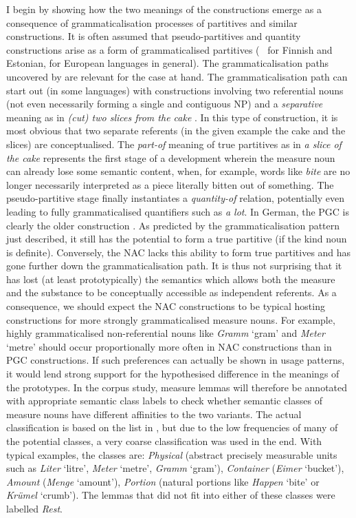 I begin by showing how the two meanings of the constructions emerge as a consequence of grammaticalisation processes of partitives and similar constructions.
It is often assumed that pseudo-partitives and quantity constructions arise as a form of grammaticalised partitives (\eg\ \citealp[536--539]{Koptjevskaja2001} for Finnish and Estonian, \citealp[559]{Koptjevskaja2001} for European languages in general).
The grammaticalisation paths uncovered by \citet[esp.\ 526--530]{Koptjevskaja2001} are relevant for the case at hand.
The grammaticalisation path can start out (in some languages) with constructions involving two referential nouns (not even necessarily forming a single and contiguous NP) and a \textit{separative} meaning as in \textit{(cut) two slices from the cake} \citep[535]{Koptjevskaja2001}.
In this type of construction, it is most obvious that two separate referents (in the given example the cake and the slices) are conceptualised.
The \textit{part-of} meaning of true partitives as in \textit{a slice of the cake} represents the first stage of a development wherein the measure noun can already lose some semantic content, when, for example, words like \textit{bite} are no longer necessarily interpreted as a piece literally bitten out of something.
The pseudo-partitive stage finally instantiates a \textit{quantity-of} relation, potentially even leading to fully grammaticalised quantifiers such as \textit{a lot}.
In German, the PGC is clearly the older construction \citep{Zimmer2015}.
As predicted by the grammaticalisation pattern just described, it still has the potential to form a true partitive (if the kind noun is definite).
Conversely, the NAC lacks this ability to form true partitives and has gone further down the grammaticalisation path.
It is thus not surprising that it has lost (at least prototypically) the semantics which allows both the measure and the substance to be conceptually accessible as independent referents.
As a consequence, we should expect the NAC constructions to be typical hosting constructions for more strongly grammaticalised measure nouns.
For example, highly grammaticalised non-referential nouns like \textit{Gramm} `gram' and \textit{Meter} `metre' should occur proportionally more often in NAC constructions than in PGC constructions.
If such preferences can actually be shown in usage patterns, it would lend strong support for the hypothesised difference in the meanings of the prototypes.
In the corpus study, measure lemmas will therefore be annotated with appropriate semantic class labels to check whether semantic classes of measure nouns have different affinities to the two variants.
The actual classification is based on the list in \citet[530]{Koptjevskaja2001}, but due to the low frequencies of many of the potential classes, a very coarse classification was used in the end.
With typical examples, the classes are:
\textit{Physical} (abstract precisely measurable units such as \textit{Liter} `litre', \textit{Meter} `metre', \textit{Gramm} `gram'),
\textit{Container} (\textit{Eimer} `bucket'),
\textit{Amount} (\textit{Menge} `amount'), 
\textit{Portion} (natural portions like \textit{Happen} `bite' or \textit{Krümel} `crumb').
The lemmas that did not fit into either of these classes were labelled \textit{Rest}.


